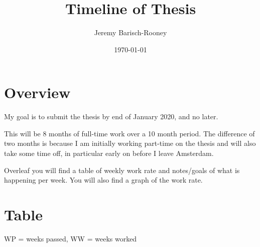 \documentclass[11pt]{article}
\author{Jeremy Barisch-Rooney}
\date{\today}
\title{Timeline of Thesis}
\begin{document}
\maketitle

\section{Overview}
\label{sec:orgc874085}
My goal is to submit the thesis by end of January 2020, and no later.

This will be 8 months of full-time work over a 10 month period. The difference
of two months is because I am initially working part-time on the thesis and
will also take some time off, in particular early on before I leave Amsterdam.

Overleaf you will find a table of weekly work rate and notes/goals of what is
happening per week. You will also find a graph of the work rate.

\pagebreak
\section{Table}
\label{sec:orgd92ccba}
WP = weeks passed, WW = weeks worked
\end{document}
